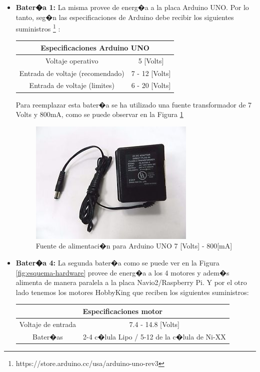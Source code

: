 \begin{itemize}
	\item \textbf{Bater�a 1: } La misma provee de energ�a a la placa Arduino UNO. Por lo tanto, seg�n las especificaciones de Arduino
	debe recibir los siguientes suministros \footnote{https://store.arduino.cc/usa/arduino-uno-rev3} :
	
	\begin{center}
		\begin{tabular}{|c|c|}
			\hline 
			\multicolumn{2}{|c|}{\textbf{Especificaciones Arduino UNO}} \\ 
			\hline 
			Voltaje operativo & 5 [Volts] \\ 
			\hline 
			Entrada de voltaje (recomendado)  & 7 - 12  [Volts] \\ 
			\hline 
			Entrada de voltaje (limites) & 6 - 20 [Volts] \\ 
			\hline 
		\end{tabular} 
	\end{center}
	Para reemplazar esta bater�a se ha utilizado una fuente transformador de 7 Volts y 800mA, como se puede observar en la Figura \ref{fig:fuentearduino}
	\begin{figure}[h!]
		\centering
		\includegraphics[width=0.4\linewidth, height=0.2\textheight]{Imagenes/fuenteArduinoo}
		\caption{Fuente de alimentaci�n para Arduino UNO 7 [Volts] - 800[mA]}
		\label{fig:fuentearduino}
	\end{figure}
	
	
	
	
	\item \textbf{Bater�a 4: } La segunda bater�a como se puede ver en la Figura \ref{fig:esquema-hardware} provee de energ�a a los 4 motores  y adem�s alimenta de manera paralela a la placa Navio2/Raspberry Pi. Y por el otro lado tenemos los motores HobbyKing que reciben los siguientes suministros:
	
	\begin{center}
		\begin{tabular}{|c|c|}
			\hline 
			\multicolumn{2}{|c|}{Especificaciones motor} \\ 
			\hline 
			Voltaje de entrada & 7.4 - 14.8 [Volts] \\ 
			\hline 
			Bater�as & 2-4 c�lula Lipo / 5-12 de la c�lula de Ni-XX \\ 
			\hline 
		\end{tabular} 
	\end{center}
	

\end{itemize}
